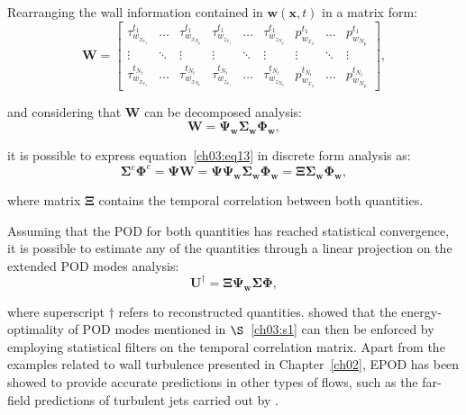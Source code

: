 Rearranging the wall information contained in $\boldsymbol{w}(\boldsymbol{x}, t)$ in a matrix form:
\begin{equation}
  \mathbf{W}=\begin{bmatrix}
      \tau_{w_{x_{x_1}}}^{t_1} & \dots  & \tau_{w_{x_{N_p}}}^{t_1} & \tau_{w_{z_{x_1}}}^{t_1} & \dots  & \tau_{w_{z_{N_p}}}^{t_1} & p_{w_{x_1}}^{t_1} & \dots  & p_{w_{N_p}}^{t_1}\\
      \vdots         & \ddots & \vdots         & \vdots         & \ddots & \vdots  & \vdots         & \ddots & \vdots \\
      \tau_{w_{x_{x_1}}}^{t_{N_t}} & \dots  & \tau_{w_{x_{N_p}}}^{t_{N_t}} & \tau_{w_{z_{x_1}}}^{t_{N_t}} & \dots  & \tau_{w_{z_{N_p}}}^{t_{N_t}}  & p_{w_{x_1}}^{t_{N_t}} & \dots  & p_{w_{N_p}}^{t_{N_t}}
      \end{bmatrix},
  \label{ch03:eq14}
\end{equation}

\noindent and considering that $\mathbf{W}$ can be decomposed analysis:
\begin{equation}
  \boldsymbol{W} =  \boldsymbol{\Psi_w}\boldsymbol{\Sigma_w}\boldsymbol{\Phi_w},
  \label{ch03:eq15}
\end{equation}

\noindent it is possible to express equation~\ref{ch03:eq13} in discrete form analysis as:
\begin{equation}
    \boldsymbol{\Sigma}^e\boldsymbol{\Phi}^e=\boldsymbol{\Psi}\boldsymbol{W}=\boldsymbol{\Psi}\boldsymbol{\Psi_w}\boldsymbol{\Sigma_w}\boldsymbol{\Phi_w}=\boldsymbol{\Xi}\boldsymbol{\Sigma_w}\boldsymbol{\Phi_w},
    \label{ch03:eq16}
\end{equation}

\noindent where matrix $\boldsymbol{\Xi}$ contains the temporal correlation between both quantities.

Assuming that the POD for both quantities has reached statistical convergence, it is possible to estimate any of the quantities through a linear projection on the extended POD modes analysis:
\begin{equation}
  \boldsymbol{U}^{\dagger} =  \boldsymbol{\Xi}\boldsymbol{\Psi_w}\boldsymbol{\Sigma}\boldsymbol{\Phi},
  \label{ch03:eq15}
\end{equation}

\noindent where superscript $\dagger$ refers to reconstructed quantities.
\citet{discetti2018estimation} showed that the energy-optimality of POD modes mentioned in $\S$~\ref{ch03:s1} can then be enforced by employing statistical filters on the temporal correlation matrix.
Apart from the examples related to wall turbulence presented in Chapter~\ref{ch02}, EPOD has been showed to provide accurate predictions in other types of flows, such as the far-field predictions of turbulent jets carried out by \citet{tinney2008low}.

